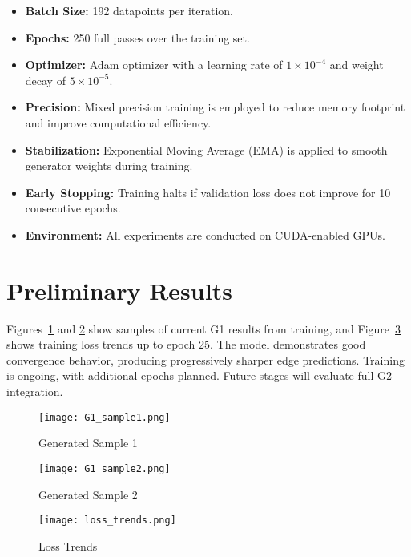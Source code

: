 \documentclass[10pt,twocolumn,letterpaper]{article}
\begin{document}
\begin{itemize}
    \item \textbf{Batch Size:} 192 datapoints per iteration.
    \item \textbf{Epochs:} 250 full passes over the training set.
    \item \textbf{Optimizer:} Adam optimizer with a learning rate of $1 \times 10^{-4}$ and weight decay of $5 \times 10^{-5}$.
    \item \textbf{Precision:} Mixed precision training is employed to reduce memory footprint and improve computational efficiency.
    \item \textbf{Stabilization:} Exponential Moving Average (EMA) is applied to smooth generator weights during training.
    \item \textbf{Early Stopping:} Training halts if validation loss does not improve for 10 consecutive epochs.
    \item \textbf{Environment:} All experiments are conducted on CUDA-enabled GPUs.
\end{itemize}

\section{Preliminary Results}
Figures~\ref{fig:g1_sample1_1} and \ref{fig:g1_sample1_2} show samples of current G1 results from training, and Figure~\ref{fig:loss_trends} shows training loss trends up to epoch 25. The model demonstrates good convergence behavior, producing progressively sharper edge predictions. Training is ongoing, with additional epochs planned. Future stages will evaluate full G2 integration.

\begin{figure}[h]
\centering
\texttt{[image: G1\_sample1.png]}
\caption{Generated Sample 1}
\label{fig:g1_sample1_1}
\end{figure}

\begin{figure}[h]
\centering
\texttt{[image: G1\_sample2.png]}
\caption{Generated Sample 2}
\label{fig:g1_sample1_2}
\end{figure}



\begin{figure}[h]
\centering
\texttt{[image: loss\_trends.png]}
\caption{Loss Trends}
\label{fig:loss_trends}
\end{figure}
\end{document}
